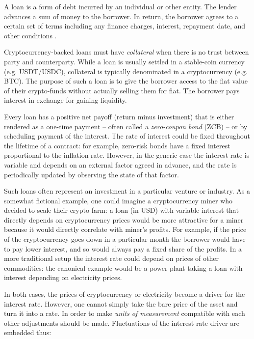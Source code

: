 \documentclass[runningheads]{llncs}
\begin{document}
A loan is a form of debt incurred by an individual or other entity.
The lender advances a sum of money to the borrower. In return, the
borrower agrees to a certain set of terms including any finance charges,
interest, repayment date, and other conditions \cite{loan}.

Cryptocurrency-backed loans must have \emph{collateral} when there is no trust
between party and counterparty. While a loan is usually settled in a
stable-coin currency (e.g. USDT/USDC), collateral is typically denominated
in a cryptocurrency (e.g. BTC). The purpose of such a loan is to give
the borrower access to the fiat value of their crypto-funds without
actually selling them for fiat. The borrower pays interest in exchange
for gaining liquidity.

Every loan has a positive net payoff (return minus investment) that
is either rendered as a one-time payment -- often called a \emph{zero-coupon bond} (ZCB) -- or by scheduling
payment of the interest. The rate of interest could be fixed throughout
the lifetime of a contract: for example, zero-risk bonds have a fixed
interest proportional to the inflation rate.
However, in the generic case the interest rate is variable and depends
on an external factor agreed in advance, and the rate is periodically
updated by observing the state of that factor. 

Such loans often represent an investment in a particular venture or industry. As
a somewhat fictional example, one could imagine a cryptocurrency miner
who decided to scale their crypto-farm: a loan (in USD) with variable
interest that directly depends on cryptocurrency prices would be more
attractive for a miner because it would directly correlate with miner's
profits. For example, if the price of the cryptocurrency goes down
in a particular month the borrower would have to pay lower interest, and so would always pay a fixed share of the profits. In a more traditional
setup the interest rate could depend on prices of other commodities: the canonical example would be a power plant taking a loan
with interest depending on electricity prices. 

In both cases, the prices of
cryptocurrency or electricity become a driver for the interest
rate.
However, one cannot simply take the bare price of the asset and turn
it into a rate. In order to make \emph{units of measurement} compatible with each other
adjustments should be made. Fluctuations of the interest rate driver
are embedded thus:
\end{document}
